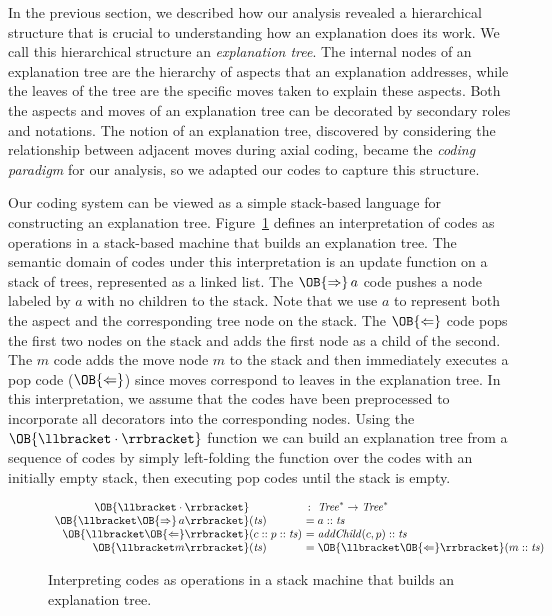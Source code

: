 \documentclass[sigconf]{acmart}
\newcommand{\Push}{\OB{\Rightarrow}}
\newcommand{\Pop}{\OB{\Leftarrow}}
\newcommand{\Sem}[1]{\OB{\llbracket#1\rrbracket}}
\begin{document}
In the previous section, we described how our analysis revealed a hierarchical
structure that is crucial to understanding how an explanation does its work.
%
We call this hierarchical structure an \emph{explanation tree}. The internal
nodes of an explanation tree are the hierarchy of aspects that an explanation
addresses, while the leaves of the tree are the specific moves taken to explain
these aspects. Both the aspects and moves of an explanation tree can be
decorated by secondary roles and notations.
%
The notion of an explanation tree, discovered by considering the relationship
between adjacent moves during axial coding, became the \emph{coding paradigm}
for our analysis, so we adapted our codes to capture this structure.


Our coding system can be viewed as a simple stack-based language for
constructing an explanation tree. Figure~\ref{fig:semantics} defines an
interpretation of codes as operations in a stack-based machine that builds an
explanation tree.
%
The semantic domain of codes under this interpretation is an update function on
a stack of trees, represented as a linked list. The $\Push\,a$ code pushes a
node labeled by $a$ with no children to the stack. Note that we use $a$ to
represent both the aspect and the corresponding tree node on the stack. The
$\Pop$ code pops the first two nodes on the stack and adds the first node as a
child of the second. The $m$ code adds the move node $m$ to the stack and then
immediately executes a pop code ($\Pop$) since moves correspond to leaves in
the explanation tree.
%
In this interpretation, we assume that the codes have been preprocessed to
incorporate all decorators into the corresponding nodes.
%
Using the $\Sem{\cdot}$ function we can build an explanation tree from a
sequence of codes by simply left-folding the function over the codes with an
initially empty stack, then executing pop codes until the stack is empty.


\newcommand{\TS}{\mathit{ts}}

\begin{figure}
\[
\begin{array}{r@{}l@{~}l}
\Sem{\cdot}    &            &\,:~ \mathit{Tree}^* \to \mathit{Tree}^* \\
\Sem{\Push\,a} &(\TS)       &= a::\TS \\
\Sem{\Pop}     &(c::p::\TS) &= \mathit{addChild}(c,p)::\TS \\
\Sem{m}        &(\TS)       &= \Sem{\Pop}(m::\TS)
\end{array}
\]
\vspace{-1.5ex}
\caption{Interpreting codes as operations in a stack machine that builds an
explanation tree.}
\label{fig:semantics}
\end{figure}
\end{document}
